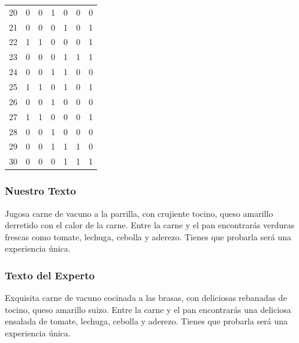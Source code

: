 \begin{table}
\begin{tabular}{|r|c|c|c|c|c|c|}
20 &         0 &         0 &         1 &         0 &         0 &         0 \\
21 &         0 &         0 &         0 &         1 &         0 &         1 \\
22 &         1 &         1 &         0 &         0 &         0 &         1 \\
23 &         0 &         0 &         0 &         1 &         1 &         1 \\
24 &         0 &         0 &         1 &         1 &         0 &         0 \\
25 &         1 &         1 &         0 &         1 &         0 &         1 \\
26 &         0 &         0 &         1 &         0 &         0 &         0 \\
27 &         1 &         1 &         0 &         0 &         0 &         1 \\
28 &         0 &         0 &         1 &         0 &         0 &         0 \\
29 &         0 &         0 &         1 &         1 &         1 &         0 \\
30 &         0 &         0 &         0 &         1 &         1 &         1 

\end{tabular}
\end{table}


\subsubsection{Nuestro Texto}

Jugosa carne de vacuno  a la parrilla, con crujiente tocino, queso amarillo  derretido con el calor de la carne. Entre la carne y el pan encontrarás verduras frescas como tomate, lechuga, cebolla y aderezo. Tienes que probarla será una experiencia única.

\subsubsection{Texto del Experto}

Exquisita carne de vacuno  cocinada a las brasas, con deliciosas rebanadas de tocino, queso amarillo suizo. Entre la carne y el pan encontrarás una deliciosa ensalada de tomate, lechuga, cebolla y aderezo. Tienes que probarla será una experiencia única.

